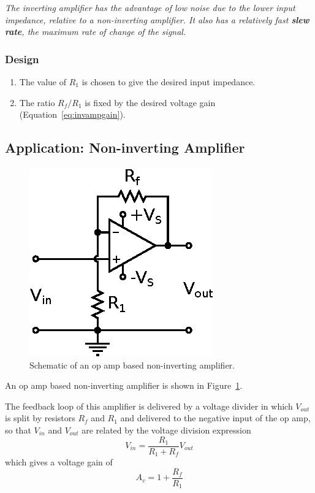 \documentclass[11pt]{article}
\begin{document}
\emph{The inverting amplifier has the advantage of low noise due to
the lower input impedance, relative to a non-inverting amplifier. It
also has a relatively fast \textbf{slew rate}, the maximum rate of
change of the signal.}

\subsubsection*{Design}
\begin{enumerate}
\item The value of $R_1$ is chosen to give the desired input
  impedance.

\item The ratio $R_f/R_1$ is fixed by the desired voltage gain
  (Equation~\ref{eq:invampgain}).
\end{enumerate}

\subsection{Application: Non-inverting Amplifier}
\label{sec:noninvertingamp}

\begin{figure}[ht]
  \begin{center}
    \includegraphics{noninvertingamp.eps}
    \caption{Schematic of an op amp based non-inverting amplifier.}
    \label{fig:noninvertingamp}
  \end{center}
\end{figure}

An op amp based non-inverting amplifier is shown in
Figure~\ref{fig:noninvertingamp}.

The feedback loop of this amplifier is delivered by a voltage divider
in which $V_{out}$ is split by resistors $R_f$ and $R_1$ and delivered
to the negative input of the op amp, so that $V_{in}$ and $V_{out}$
are related by the voltage division expression
\begin{equation}
  V_{in} = \frac{R_1}{R_1 + R_f} V_{out}
\end{equation}
which gives a voltage gain of
\begin{equation}
  A_v = 1 + \frac{R_f}{R_1}
  \label{eq:noninvampgain}
\end{equation}
\end{document}
